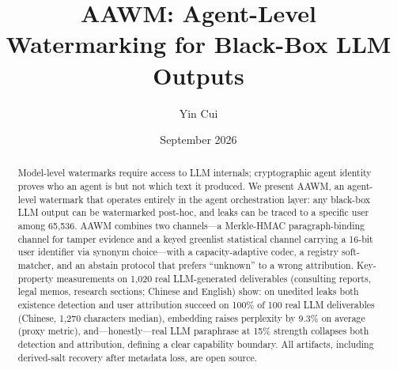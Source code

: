 \documentclass[11pt]{article}
\title{AAWM: Agent-Level Watermarking for Black-Box LLM Outputs}
\author{Yin Cui}
\date{September 2026}
\begin{document}
\maketitle

\begin{abstract}
Model-level watermarks require access to LLM internals; cryptographic agent
identity proves who an agent is but not which text it produced. We present
AAWM, an agent-level watermark that operates entirely in the agent
orchestration layer: any black-box LLM output can be watermarked post-hoc,
and leaks can be traced to a specific user among 65,536. AAWM combines two
channels---a Merkle-HMAC paragraph-binding channel for tamper evidence and
a keyed greenlist statistical channel carrying a 16-bit user identifier via
synonym choice---with a capacity-adaptive codec, a registry soft-matcher,
and an abstain protocol that prefers ``unknown'' to a wrong attribution.
Key-property measurements on 1,020 real LLM-generated deliverables
(consulting reports, legal memos, research sections; Chinese and English)
show: on unedited leaks both existence detection and user
attribution succeed on 100\% of 100 real LLM deliverables (Chinese,
1,270 characters median), embedding
raises perplexity by 9.3\% on average (proxy metric), and---honestly---real
LLM paraphrase at 15\% strength collapses both detection and attribution,
defining a clear capability boundary. All artifacts, including derived-salt
recovery after metadata loss, are open source.
\end{abstract}











\appendix

\end{document}
